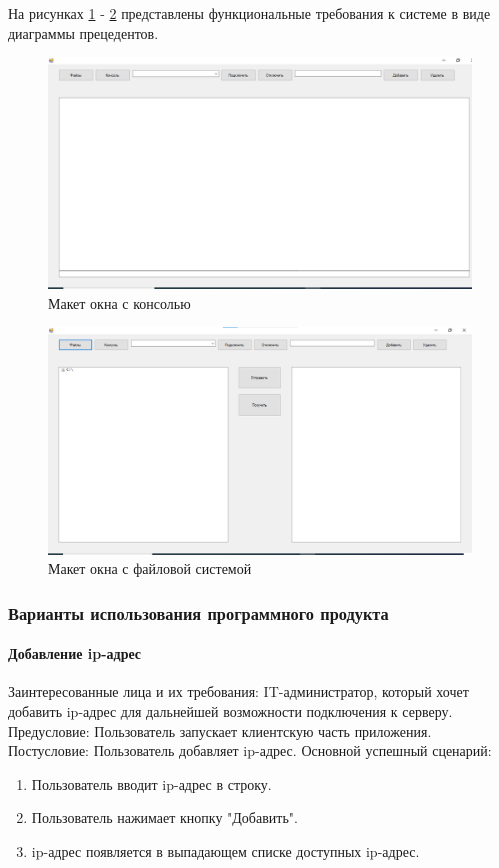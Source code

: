 На рисунках \ref{fig:-maket_one} - \ref{fig:-maket_two} представлены функциональные требования к системе в виде диаграммы прецедентов.
\begin{figure}
	\centering
	\includegraphics[width=1\linewidth]{"images/Макет окна(консоль)"}
	\caption{Макет окна с консолью}
	\label{fig:-maket_one}
\end{figure}
\begin{figure}
	\centering
	\includegraphics[width=1\linewidth]{"images/Макет окна(файлы)"}
	\caption{Макет окна с файловой системой}
	\label{fig:-maket_two}
\end{figure}

\subsubsection{Варианты использования программного продукта}
\paragraph{Добавление ip-адрес}
Заинтересованные лица и их требования: IT-администратор, который хочет добавить ip-адрес для дальнейшей возможности подключения к серверу.
Предусловие: Пользователь запускает клиентскую часть приложения.
Постусловие: Пользователь добавляет ip-адрес.
Основной успешный сценарий:
\begin{enumerate}
	\item Пользователь вводит ip-адрес в строку.
	\item Пользователь нажимает кнопку "Добавить".
	\item ip-адрес появляется в выпадающем списке доступных ip-адрес.
\end{enumerate}

